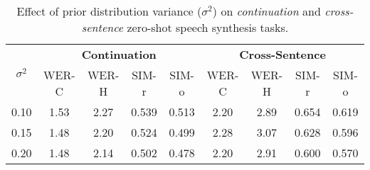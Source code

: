 

\begin{table}[!ht]

  \caption{Effect of prior distribution variance (\(\sigma^2\)) on \textit{continuation} and \textit{cross-sentence} zero-shot speech synthesis tasks.}
  \label{tab:initD}
  \centering 
    \resizebox{0.92\textwidth}{!}
  {
  \begin{tabular}{ c cccc cccc}

    \toprule[1pt]
 \multirow{2}{*}{\textbf{\(\sigma^2\)}} & \multicolumn{4}{c}{\textbf{Continuation}} & \multicolumn{4}{c}{\textbf{Cross-Sentence}} \\
 \cmidrule(r){2-5} \cmidrule(r){6-9}
     & WER-C  & WER-H  & SIM-r & SIM-o   & WER-C  & WER-H &  SIM-r & SIM-o   \\

 \midrule
   0.10 & 1.53 & 2.27 & 0.539 & 0.513  & 2.20 & 2.89 & 0.654 & 0.619 \\
    0.15&1.48 &2.20 &0.524 &0.499  &2.28 &3.07 &0.628 & 0.596\\
   0.20 &1.48 &2.14 &0.502 &0.478  &2.20 &2.91 &0.600 & 0.570\\
  	 	 	 		 	 		 
		 	 		 	 		

\bottomrule[1pt]
\end{tabular}

}


\end{table}


